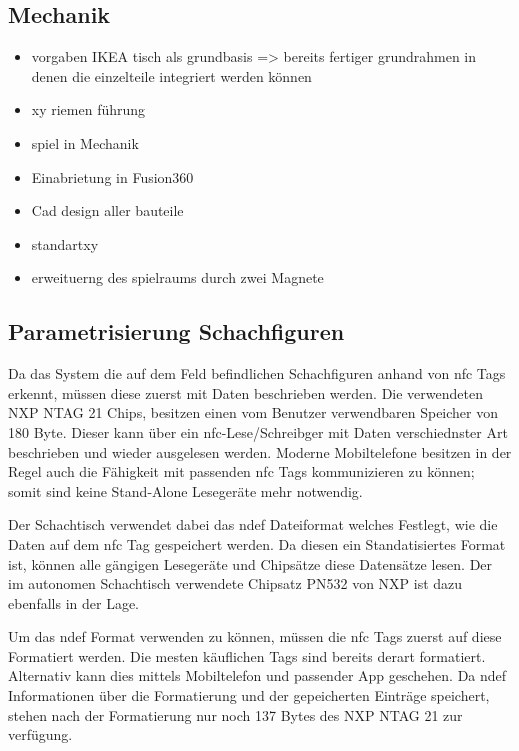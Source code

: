 \hypertarget{mechanik}{%
\subsection{Mechanik}\label{mechanik}}

\begin{itemize}
\item
  vorgaben IKEA tisch als grundbasis =\textgreater{} bereits fertiger
  grundrahmen in denen die einzelteile integriert werden können
\item
  xy riemen führung
\item
  spiel in Mechanik
\item
  Einabrietung in Fusion360
\item
  Cad design aller bauteile
\item
  standartxy
\item
  erweituerng des spielraums durch zwei Magnete
\end{itemize}

\hypertarget{parametrisierung-schachfiguren}{%
\subsection{Parametrisierung
Schachfiguren}\label{parametrisierung-schachfiguren}}

Da das System die auf dem Feld befindlichen Schachfiguren anhand von
\gls{nfc} Tags erkennt, müssen diese zuerst mit Daten beschrieben
werden. Die verwendeten NXP NTAG 21 Chips, besitzen einen vom Benutzer
verwendbaren Speicher von 180 Byte. Dieser kann über ein
\gls{nfc}-Lese/Schreibger mit Daten verschiednster Art beschrieben und
wieder ausgelesen werden. Moderne Mobiltelefone besitzen in der Regel
auch die Fähigkeit mit passenden \gls{nfc} Tags kommunizieren zu können;
somit sind keine Stand-Alone Lesegeräte mehr notwendig.

Der Schachtisch verwendet dabei das \gls{ndef} Dateiformat welches
Festlegt, wie die Daten auf dem \gls{nfc} Tag gespeichert werden. Da
diesen ein Standatisiertes Format ist, können alle gängigen Lesegeräte
und Chipsätze diese Datensätze lesen. Der im autonomen Schachtisch
verwendete Chipsatz PN532 von NXP ist dazu ebenfalls in der Lage.

Um das \gls{ndef} Format verwenden zu können, müssen die \gls{nfc} Tags
zuerst auf diese Formatiert werden. Die mesten käuflichen Tags sind
bereits derart formatiert. Alternativ kann dies mittels Mobiltelefon und
passender App geschehen. Da \gls{ndef} Informationen über die
Formatierung und der gepeicherten Einträge speichert, stehen nach der
Formatierung nur noch 137 Bytes des NXP NTAG 21 zur verfügung.

